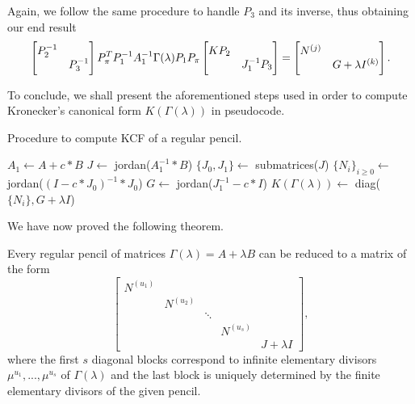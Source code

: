 Again, we follow the same procedure to handle \(P_{3}\) and its inverse, thus obtaining our end result
\begin{gather}
    \scalemath{0.975}{
        \begin{bmatrix}
            P_{2}^{-1} & \\
            & P_{3}^{-1}
        \end{bmatrix}
        P_{\pi}^T P_{1}^{-1} A_{1}^{-1} \Gamma(\lambda) P_{1} P_{\pi}
        \begin{bmatrix}
            KP_{2} & \\
            & J_{1}^{-1}P_{3}
        \end{bmatrix} =
        \begin{bmatrix}
            N^{(j)} & \\
            & G + \lambda I^{(k)}
        \end{bmatrix}. \label{gamma-reg}
    }
\end{gather}

To conclude, we shall present the aforementioned steps used in order to compute Kronecker's canonical form
\(K(\Gamma(\lambda))\) in pseudocode.
\begin{algorithm}
    \caption{Procedure to compute KCF of a regular pencil.}\label{alg:kcf-regular}
    $A_{1} \gets A + c*B$\;
    $J \gets $ jordan($A_{1}^{-1}*B$)\;
    $\{J_{0}, J_{1}\} \gets$ submatrices($J$)\;
    $\{N_{i}\}_{i \geq 0} \gets $ jordan($(I - c*J_{0})^{-1} * J_{0}$)\;
    $G \gets $ jordan($J_{1}^{-1} - c*I$)\;
    $K(\Gamma(\lambda)) \gets $ diag($\{N_{i}\}, G +\lambda I$)
\end{algorithm}

We have now proved the following theorem.
\begin{theorem}
    Every regular pencil of matrices \(\Gamma(\lambda) = A + \lambda B\) can be reduced to a matrix of the form
    \[
        \begin{bmatrix}
            N^{(u_{1})} \\
            & N^{(u_{2})} \\
            & & \ddots \\
            & & & N^{(u_{s})} \\
            & & & & J + \lambda I
        \end{bmatrix},
    \]
    where the first \(s\) diagonal blocks correspond to infinite elementary divisors
    \(\mu^{u_{1}}, ..., \mu^{u_{s}}\) of \(\Gamma(\lambda)\) and the last block is uniquely determined by the
    finite elementary divisors of the given pencil.
\end{theorem}


